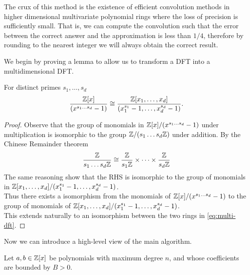 
The crux of this method is the existence of efficient convolution methods in higher dimensional multivariate polynomial rings where the loss of precision is sufficiently small. That is, we can compute the convolution such that the error between the correct answer and the approximation is less than $1 / 4$, therefore by rounding to the nearest integer we will always obtain the correct result.

We begin by proving a lemma to allow us to transform a DFT into a multidimensional DFT.

\begin{lemma}
    For distinct primes $s_1, \ldots, s_d$
    \begin{equation}\label{eq:multi-dft}
        \frac{{\mathbb Z}[x]}{(x^{s_1\ldots s_d} - 1)} \cong \frac{{\mathbb Z}[x_1, \ldots, x_d]}{(x_1^{s_1} - 1, \ldots, x_d^{s_d} - 1)}.
    \end{equation}
\end{lemma}

\begin{proof}
    Observe that the group of monomials in ${\mathbb Z}[x]/(x^{s_1\ldots s_d} - 1)$ under multiplication is isomorphic to the group ${\mathbb Z}/(s_1 \ldots s_d{\mathbb Z})$ under addition. By the Chinese Remainder theorem
    \[
        \frac{{\mathbb Z}}{s_1\ldots s_d {\mathbb Z}} \cong \frac{{\mathbb Z}}{s_1 {\mathbb Z}} \times \cdots \times \frac{{\mathbb Z}}{s_d {\mathbb Z}}
    \]
    The same reasoning show that the RHS is isomorphic to the group of monomials in ${\mathbb Z}[x_1, \ldots, x_d]/(x_1^{s_1} - 1, \ldots, x_d^{s_d} - 1)$.\\
    Thus there exists a isomorphism from the monomials of ${\mathbb Z}[x]/(x^{s_1\ldots s_d} - 1)$ to the group of monomials of ${\mathbb Z}[x_1, \ldots, x_d]/(x_1^{s_1} - 1, \ldots, x_d^{s_d} - 1)$.\\
    This extends naturally to an isomorphism between the two rings in \eqref{eq:multi-dft}.
\end{proof}

Now we can introduce a high-level view of the main algorithm.

Let $a, b \in {\mathbb Z}[x]$ be polynomials with maximum degree $n$, and whose coefficients are bounded by $B > 0$.

